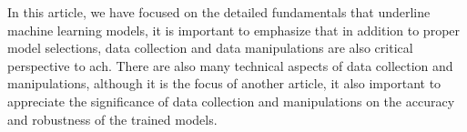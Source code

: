 
\par
In this article, we have focused on the detailed fundamentals that underline machine learning models, it is important to emphasize that in addition to proper model selections, data collection and data manipulations are also critical perspective to ach. There are also many technical aspects of data collection and manipulations, although it is the focus of another article, it also important to appreciate the significance of data collection and manipulations on the accuracy and robustness of the trained models.
\par 
